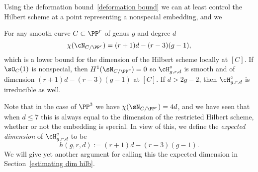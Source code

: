 Using the deformation bound~\ref{deformation bound} we can at least control the Hilbert scheme at
a point representing a nonspecial embedding, and we 

\begin{theorem}\label{nonspecial Hilbert}
For any smooth curve $C\subset \PP^{r}$ of genus $g$ and degree $d$
$$
\chi(\cN_{C/\PP^{r}}) = (r+1)d - (r-3)(g-1),
$$
which is a lower bound for the dimension of the Hilbert scheme locally at $[C]$. 
If $\sO_{C}(1)$ is nonspecial, 
 then $H^1(\sN_{C/\PP^r})=0$ so
 $\cH^\circ_{g,r,d}$ is smooth and of dimension $ (r+1)d - (r-3)(g-1)$ at $[C]$.
 If $d>2g-2$,
then $\cH^\circ_{g,r,d}$ is irreducible as well.
\end{theorem}

Note that in the case of $\PP^3$ we have $\chi(\sN_{C/\PP^r}) = 4d$, and we have
seen that when $d\leq 7$ this is always equal to the dimension of the restricted Hilbert
scheme, whether or not the embedding is special. In view of this,
we define the \emph{expected dimension} of $\cH^\circ_{g,r,d}$ to be
$$
h(g,r,d) := (r+1)d - (r-3)(g-1).
$$
We will give yet another argument for calling this the expected dimension in Section~\ref{estimating dim hilb}.

